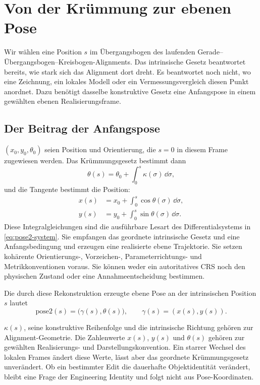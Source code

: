\chapter{Von der Krümmung zur ebenen Pose}

Wir wählen eine Position \(s\) im Übergangsbogen des laufenden
Gerade--Übergangsbogen--Kreisbogen-Alignments. Das intrinsische Gesetz
beantwortet bereits, wie stark sich das Alignment dort dreht. Es beantwortet
noch nicht, wo eine Zeichnung, ein lokales Modell oder ein Vermessungsvergleich
diesen Punkt anordnet. Dazu benötigt dasselbe konstruktive Gesetz eine
Anfangspose in einem gewählten ebenen Realisierungsframe.

\section{Der Beitrag der Anfangspose}

\((x_0,y_0,\theta_0)\) seien Position und Orientierung, die \(s=0\) in diesem
Frame zugewiesen werden. Das Krümmungsgesetz bestimmt dann
\begin{equation}
\theta(s)=\theta_0+\int_0^s\kappa(\sigma)\,\dd\sigma,
\label{eq:pose2-heading-integral}
\end{equation}
und die Tangente bestimmt die Position:
\begin{align}
x(s)&=x_0+\int_0^s\cos\theta(\sigma)\,\dd\sigma,
\label{eq:pose2-x-integral}\\
y(s)&=y_0+\int_0^s\sin\theta(\sigma)\,\dd\sigma.
\label{eq:pose2-y-integral}
\end{align}
Diese Integralgleichungen sind die ausführbare Lesart des Differentialsystems
in \cref{eq:pose2-system}. Sie empfangen das geordnete intrinsische Gesetz und
eine Anfangsbedingung und erzeugen eine realisierte ebene Trajektorie. Sie
setzen kohärente Orientierungs-, Vorzeichen-, Parameterrichtungs- und
Metrikkonventionen voraus. Sie können weder ein autoritatives CRS noch den
physischen Zustand oder eine Annahmeentscheidung bestimmen.

\begin{definition}[pose2]
\label{def:pose2}
Die durch diese Rekonstruktion erzeugte ebene Pose an der intrinsischen
Position \(s\) lautet
\[
\mathrm{pose2}(s)=\bigl(\gamma(s),\theta(s)\bigr),
\qquad
\gamma(s)=(x(s),y(s)).
\]
\end{definition}

\(\kappa(s)\), seine konstruktive Reihenfolge und die intrinsische Richtung
gehören zur Alignment-Geometrie. Die Zahlenwerte \(x(s)\), \(y(s)\) und
\(\theta(s)\) gehören zur gewählten Realisierungs- und
Darstellungskonvention. Ein starrer Wechsel des lokalen Frames ändert diese
Werte, lässt aber das geordnete Krümmungsgesetz unverändert. Ob ein bestimmter
Edit die dauerhafte Objektidentität verändert, bleibt eine Frage der
Engineering Identity und folgt nicht aus Pose-Koordinaten.

